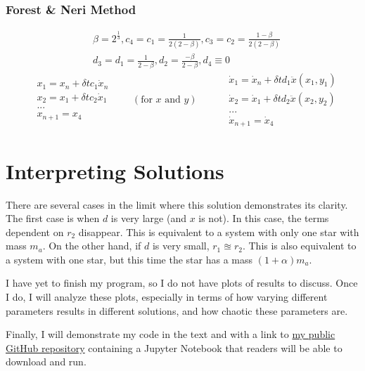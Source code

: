 \documentclass[preprint,titlepage,preprintnumbers,amsmath,amssymb,aps,11pt]{revtex4-2}
\begin{document}
\subsubsection{Forest \& Neri Method}
\begin{equation}
    \begin{aligned}
         & \beta=2^\frac{1}{3}, c_4=c_1=\frac{1}{2(2-\beta)}, c_3=c_2=\frac{1-\beta}{2(2-\beta)} \\
         & d_3=d_1=\frac{1}{2-\beta}, d_2=\frac{-\beta}{2-\beta}, d_4\equiv 0
    \end{aligned}
\end{equation}
\begin{equation}
    \begin{split}
        &x_1=x_n+ \delta tc_1 \dot{x}_n\\
        &x_2=x_1+ \delta tc_2 \dot{x}_1\\
        &...\\
        &x_{n+1}=x_4
    \end{split}
    \qquad(\text{for }x\text{ and } y)\qquad
    \begin{split}
        &\dot{x}_1=\dot{x}_n+\delta td_1\ddot{x}(x_1,y_1)\\
        &\dot{x}_2=\dot{x}_1+\delta td_2\ddot{x}(x_2,y_2)\\
        &...\\
        &\dot{x}_{n+1}=\dot{x}_4
    \end{split}
\end{equation}


\section{Interpreting Solutions}
There are several cases in the limit where this solution demonstrates its clarity. The first case is when $d$ is very large (and $x$ is not). In this case, the terms dependent on $r_2$ disappear. This is equivalent to a system with only one star with mass $m_a$. On the other hand, if $d$ is very small, $r_1\approxeq r_2$. This is also equivalent to a system with one star, but this time the star has a mass $(1+\alpha)m_a$.

\bigskip

I have yet to finish my program, so I do not have plots of results to discuss. Once I do, I will analyze these plots, especially in terms of how varying different parameters results in different solutions, and how chaotic these parameters are.

Finally, I will demonstrate my code in the text and with a link to \href{https://github.com/jasperswallen/PHYS304-Project}{my public GitHub repository}
containing a Jupyter Notebook that readers will be able to download and run.
\end{document}
